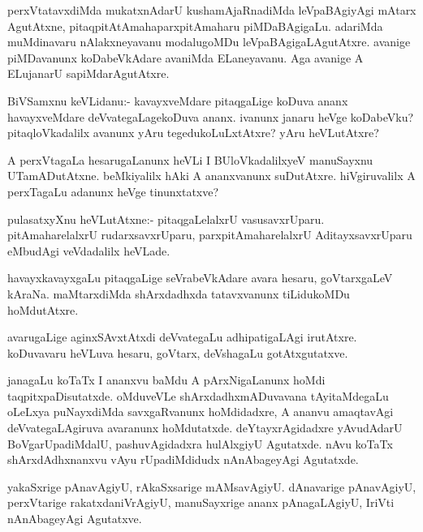 \documentclass{article}
\begin{document}
\begin{mn}
perxVtatavxdiMda mukatxnAdarU kushamAjaRnadiMda leVpaBAgiyAgi mAtarx
AgutAtxne, pitaqpitAtAmahaparxpitAmaharu piMDaBAgigaLu. adariMda
muMdinavaru nAlakxneyavanu modalugoMDu leVpaBAgigaLAgutAtxre. avanige
piMDavanunx koDabeVkAdare avaniMda ELaneyavanu. Aga avanige A
ELujanarU sapiMdarAgutAtxre.
\end{mn}

\begin{mn}
BiVSamxnu keVLidanu:- kavayxveMdare pitaqgaLige koDuva ananx
havayxveMdare deVvategaLagekoDuva ananx. ivanunx janaru heVge
koDabeVku? pitaqloVkadalilx avanunx yAru tegedukoLuLxtAtxre? yAru heVLutAtxre?
\end{mn}

\begin{mn}
A perxVtagaLa hesarugaLanunx heVLi I BUloVkadalilxyeV manuSayxnu
UTamADutAtxne. beMkiyalilx hAki A ananxvanunx
suDutAtxre. hiVgiruvalilx A perxTagaLu adanunx heVge tinunxtatxve?
\end{mn}

\begin{mn}
pulasatxyXnu heVLutAtxne:- pitaqgaLelalxrU
vasusavxrUparu. pitAmaharelalxrU rudarxsavxrUparu,
parxpitAmaharelalxrU AditayxsavxrUparu eMbudAgi veVdadalilx heVLade.
\end{mn}

\begin{mn}
havayxkavayxgaLu pitaqgaLige seVrabeVkAdare avara hesaru, goVtarxgaLeV
kAraNa. maMtarxdiMda shArxdadhxda tatavxvanunx tiLidukoMDu hoMdutAtxre.
\end{mn}

\begin{mn}
avarugaLige aginxSAvxtAtxdi deVvategaLu adhipatigaLAgi
irutAtxre. koDuvavaru heVLuva hesaru, goVtarx, deVshagaLu gotAtxgutatxve.
\end{mn}

\begin{mn}%
janagaLu koTaTx I ananxvu baMdu A pArxNigaLanunx hoMdi
taqpitxpaDisutatxde. oMduveVLe shArxdadhxmADuvavana tAyitaMdegaLu
oLeLxya puNayxdiMda savxgaRvanunx hoMdidadxre, A ananvu amaqtavAgi
deVvategaLAgiruva avaranunx hoMdutatxde. deYtayxrAgidadxre yAvudAdarU
BoVgarUpadiMdalU, pashuvAgidadxra hulAlxgiyU Agutatxde. nAvu koTaTx
shArxdAdhxnanxvu vAyu rUpadiMdidudx nAnAbageyAgi Agutatxde.
\end{mn}

\begin{mn}%
yakaSxrige pAnavAgiyU, rAkaSxsarige mAMsavAgiyU. dAnavarige
pAnavAgiyU, perxVtarige rakatxdaniVrAgiyU, manuSayxrige ananx
pAnagaLAgiyU, IriVti nAnAbageyAgi Agutatxve.
\end{mn}
\end{document}
